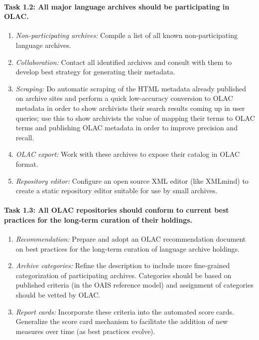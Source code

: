 \def\task{1.2}
\paragraph{Task {\task}: All major language archives should be participating in OLAC.}

\begin{enumerate}[label=\emph{\task\alph*}]
\item \emph{Non-participating archives:}
  Compile a list of all known non-participating language archives.
\item \emph{Collaboration:}
  Contact all identified archives and consult with them to develop best
  strategy for generating their metadata.
\item \emph{Scraping:}
  Do automatic scraping of the HTML metadata already published on
  archive sites and perform a quick low-accuracy conversion to OLAC
  metadata in order to show archivists their search results coming up
  in user queries; use this to show archivists the value of mapping their
  terms to OLAC terms and publishing OLAC metadata in order to
  improve precision and recall.
\item \emph{OLAC export:}
  Work with these archives to expose their catalog in OLAC format.
\item \emph{Repository editor:}
  Configure an open source XML editor (like XMLmind) to create a static repository editor
  suitable for use by small archives.
\end{enumerate}

\def\task{1.3}
\paragraph{Task {\task}: All OLAC repositories should conform to current best practices
      for the long-term curation of their holdings.}

\begin{enumerate}[label=\emph{\task\alph*}]
\item \emph{Recommendation:}
  Prepare and adopt an OLAC recommendation document on 
  best practices for the long-term curation of language archive holdings.
\item \emph{Archive categories:}
  Refine the {\tt <olac-archive>} description to include
  more fine-grained categorization of participating archives.
  Categories should be based on published criteria (in the OAIS reference model)
  and assignment of categories should be vetted by OLAC.
\item \emph{Report cards:}
  Incorporate these criteria into the automated score cards.
  Generalize the score card mechanism to facilitate the addition
  of new measures over time (as best practices evolve).
\end{enumerate}

